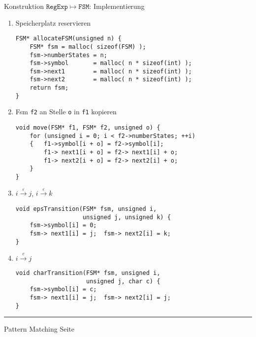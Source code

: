 \begin{slide}{}
\normalsize

\begin{center}
Konstruktion $\mathtt{RegExp} \mapsto \mathtt{FSM}$: Implementierung
\end{center}

\footnotesize
\begin{enumerate}
\item Speicherplatz reservieren
\begin{verbatim}
FSM* allocateFSM(unsigned n) {
    FSM* fsm = malloc( sizeof(FSM) );
    fsm->numberStates = n;
    fsm->symbol       = malloc( n * sizeof(int) );
    fsm->next1        = malloc( n * sizeof(int) );
    fsm->next2        = malloc( n * sizeof(int) );
    return fsm;
}
\end{verbatim}
\vspace*{-0.5cm}
\item Fsm \texttt{f2} an Stelle \texttt{o} in \texttt{f1} kopieren
\begin{verbatim}
void move(FSM* f1, FSM* f2, unsigned o) {
    for (unsigned i = 0; i < f2->numberStates; ++i)
    {   f1->symbol[i + o] = f2->symbol[i];
        f1-> next1[i + o] = f2-> next1[i] + o;
        f1-> next2[i + o] = f2-> next2[i] + o;
    }
}
\end{verbatim}
\vspace*{-0.5cm}
\item $i \stackrel{\varepsilon}{\rightarrow} j$, 
      $i \stackrel{\varepsilon}{\rightarrow} k$
\begin{verbatim}
void epsTransition(FSM* fsm, unsigned i, 
                   unsigned j, unsigned k) {
    fsm->symbol[i] = 0; 
    fsm-> next1[i] = j;  fsm-> next2[i] = k;
}
\end{verbatim}
\vspace*{-0.5cm}
\item $i \stackrel{c}{\rightarrow} j$
\begin{verbatim}
void charTransition(FSM* fsm, unsigned i, 
                    unsigned j, char c) {
    fsm->symbol[i] = c;
    fsm-> next1[i] = j;  fsm-> next2[i] = j;
}
\end{verbatim}
\end{enumerate}
\vspace*{-0.5cm}

\vspace*{\fill}
\tiny \addtocounter{mypage}{1}
\rule{17cm}{1mm}
Pattern Matching \hspace*{\fill} Seite 
\end{slide}

